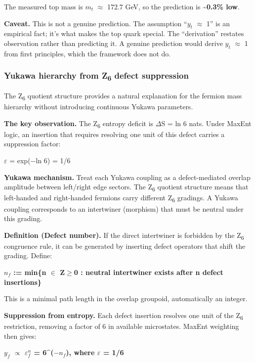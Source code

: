 \documentclass[11pt,a4paper]{article}
\theoremstyle{remark}
\begin{document}
The measured top mass is \(m_t\) \ensuremath{\approx} 172.7 GeV, so the prediction is \textbf{\textasciitilde0.3\% low}.

\textbf{Caveat.} This is not a genuine prediction. The assumption ``\(y_t\) \ensuremath{\approx} 1'' is an empirical fact; it's what makes the top quark special. The ``derivation'' restates observation rather than predicting it. A genuine prediction would derive \(y_t\) \ensuremath{\approx} 1 from first principles, which the framework does not do.

\subsubsection{Yukawa hierarchy from Z\textsubscript{6} defect suppression}\label{yukawa-hierarchy-from-zux2086-defect-suppression}

The Z\textsubscript{6} quotient structure provides a natural explanation for the fermion
mass hierarchy without introducing continuous Yukawa parameters.

\textbf{The key observation.} The Z\textsubscript{6} entropy deficit is \ensuremath{\Delta}S = ln 6 nats. Under MaxEnt logic, an insertion that requires resolving one unit of this defect carries a suppression factor:

\ensuremath{\varepsilon} = exp(\ensuremath{-}ln 6) = 1/6

\textbf{Yukawa mechanism.} Treat each Yukawa coupling as a defect-mediated overlap amplitude between left/right edge sectors. The Z\textsubscript{6} quotient structure means that left-handed and right-handed fermions carry different Z\textsubscript{6} gradings. A Yukawa coupling corresponds to an intertwiner (morphism) that must be neutral under this grading.

\textbf{Definition (Defect number).} If the direct intertwiner is forbidden by the Z\textsubscript{6} congruence rule, it can be generated by inserting defect operators that shift the grading. Define:

\textbf{\(n_f\) := min\{n \ensuremath{\in} Z\ensuremath{\geq}0 : neutral intertwiner exists after n defect insertions\}}

This is a minimal path length in the overlap groupoid, automatically an integer.

\textbf{Suppression from entropy.} Each defect insertion resolves one unit of the Z\textsubscript{6} restriction, removing a factor of 6 in available microstates. MaxEnt weighting then gives:

\textbf{\(y_f\) \ensuremath{\propto} \(\ensuremath{\varepsilon}^n_f\) = 6\^{}(\ensuremath{-}\(n_f\)), where \ensuremath{\varepsilon} = 1/6}
\end{document}
